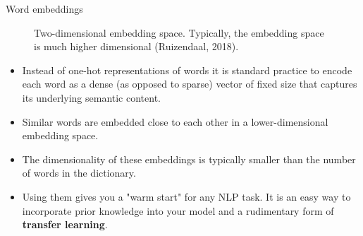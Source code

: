 %  
\begin{vbframe} {Word embeddings}
\begin{figure}
\vspace{-0.5cm}
      \centering
      \caption{Two-dimensional embedding space. Typically, the embedding space is much higher dimensional (Ruizendaal, 2018).}
      \vspace{-0.7cm}
        \end{figure}
  \begin{itemize}
    \item Instead of one-hot representations of words it is standard practice to encode each word as a dense (as opposed to sparse) vector of fixed size that captures its underlying semantic content.
    \item Similar words are embedded close to each other in a lower-dimensional embedding space. 
                \framebreak
    \item  The dimensionality of these embeddings is typically  smaller than the number of words in the dictionary. 
    \item Using them gives you a "warm start" for any NLP task. It is an easy way to incorporate prior knowledge into your model and a rudimentary form of \textbf{transfer learning}. 

\end{itemize}
\end{vbframe}
